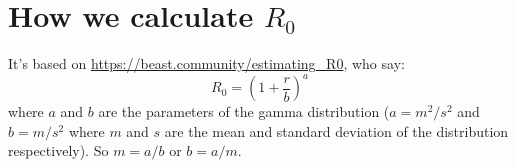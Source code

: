 \documentclass{article}
\begin{document}
\section*{How we calculate $R_0$}

It's based on \url{https://beast.community/estimating_R0}, who say:
$$ R_{0}=\left(1+\frac{r}{b}\right)^{a} $$
where $a$ and $b$ are the parameters of the gamma distribution ($ a =
m^{2}/s^{2} $ and $ b = m/s^{2} $ where $ m $ and $ s $ are the mean
and standard deviation of the distribution respectively).
So $m = a/b$ or $b= a/m$.
\end{document}
